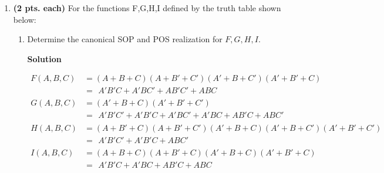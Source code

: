 \begin{enumerate}
    \item \textbf{ (2 pts. each)} For the functions F,G,H,I defined by the
        truth table shown below:
        \begin{enumerate}
            \item Determine the canonical SOP and POS realization for $F,G,H,I$.

                {
                    \begin{onlysolution}\textbf{Solution}\vspace{-1em}

                        \hspace*{-47pt}\vbox{
                            \begin{align*} %
                                F(A,B,C) &= (A+B+C)(A+B'+C')(A'+B+C')(A'+B'+C)  \\
                                &= \phantom{(}A'B'C + A'BC' + AB'C' + ABC \\[0.2ex] %
                                    G(A,B,C) &= (A'+B+C)(A'+B'+C') \\
                                    &= \phantom{(}A'B'C' + A'B'C + A'BC' + A'BC + AB'C + ABC'  \\[0.2ex]
                                        H(A,B,C) &= (A+B'+C)(A+B'+C')(A'+B+C)(A'+B+C')(A'+B'+C') \\
                                        &= \phantom{(}A'B'C' + A'B'C + ABC' \\[0.2ex]
                                            I(A,B,C) &= (A+B+C)(A+B'+C)(A'+B+C)(A'+B'+C) \\
                                            &= \phantom{(}A'B'C + A'BC + AB'C + ABC
                                        \end{align*}}
                                \end{onlysolution}}


\end{enumerate}
\end{enumerate}
